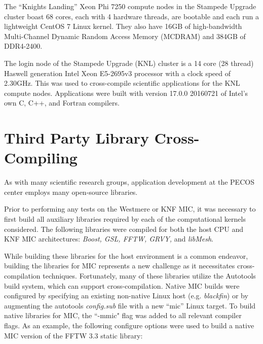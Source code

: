 The ``Knights Landing'' Xeon Phi 7250 compute nodes in the Stampede Upgrade
cluster boast 68 cores, each with 4 hardware threads, are bootable and each run
a lightweight CentOS 7 Linux kernel.  They also have 16GB of high-bandwidth
Multi-Channel Dynamic Random Access Memory (MCDRAM) and 384GB of DDR4-2400.

The login node of the Stampede Upgrade (KNL) cluster is a 14 core (28 thread)
Haswell generation Intel Xeon E5-2695v3 processor with a clock speed of
2.30GHz.  This was used to cross-compile scientific applications for the KNL
compute nodes.  Applications were built with version 17.0.0 20160721 of Intel's
own C, C++, and Fortran compilers.

\section{Third Party Library Cross-Compiling} \label{sec:cross_compile}

As with many scientific research groups, application development at
the PECOS center employs many open-source libraries.

Prior to
performing any tests on the Westmere or KNF MIC, it was necessary to
first build all auxiliary libraries required by each of the
computational kernels considered.
The following libraries were
compiled for both the host CPU and KNF MIC architectures: {\em Boost,
GSL, FFTW\cite{FFTW05}, GRVY,} and
{\em libMesh}.

While building these libraries for the host environment is
a common endeavor, building the libraries for MIC
represents a new challenge as it necessitates cross-compilation
techniques.
Fortunately, many of these libraries utilize the
Autotools build system, which can support cross-compilation.
Native MIC builds were configured by
specifying an existing non-native Linux host
(e.g. {\em blackfin}) or by augmenting the autotools {\em config.sub}
file with a new ``mic'' Linux target.
To build native libraries for MIC, the ``-mmic"
flag was added to all relevant compiler flags.
As an example, the following configure options were used to build a
native MIC version of the FFTW 3.3 static library:

